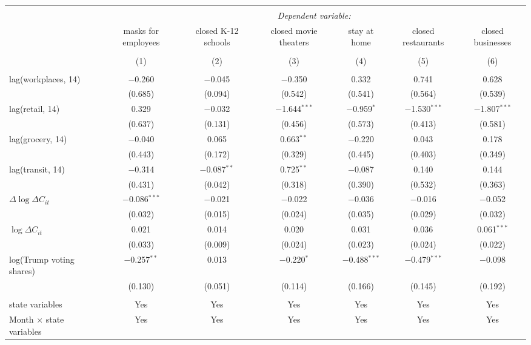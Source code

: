 \begin{tabular}{@{\extracolsep{1pt}}lcccccc} 
\\[-1.8ex]\hline 
\hline \\[-1.8ex] 
 & \multicolumn{6}{c}{\textit{Dependent variable:}} \\ 
\cline{2-7} 
 & masks for employees & closed K-12 schools & closed movie theaters & stay at home & closed restaurants & closed businesses \\ 
\\[-1.8ex] & (1) & (2) & (3) & (4) & (5) & (6)\\ 
\hline \\[-1.8ex] 
 lag(workplaces, 14) & $-$0.260 & $-$0.045 & $-$0.350 & 0.332 & 0.741 & 0.628 \\ 
  & (0.685) & (0.094) & (0.542) & (0.541) & (0.564) & (0.539) \\ 
  lag(retail, 14) & 0.329 & $-$0.032 & $-$1.644$^{***}$ & $-$0.959$^{*}$ & $-$1.530$^{***}$ & $-$1.807$^{***}$ \\ 
  & (0.637) & (0.131) & (0.456) & (0.573) & (0.413) & (0.581) \\ 
  lag(grocery, 14) & $-$0.040 & 0.065 & 0.663$^{**}$ & $-$0.220 & 0.043 & 0.178 \\ 
  & (0.443) & (0.172) & (0.329) & (0.445) & (0.403) & (0.349) \\ 
  lag(transit, 14) & $-$0.314 & $-$0.087$^{**}$ & 0.725$^{**}$ & $-$0.087 & 0.140 & 0.144 \\ 
  & (0.431) & (0.042) & (0.318) & (0.390) & (0.532) & (0.363) \\ 
  $\Delta \log \Delta C_{it}$ & $-$0.086$^{***}$ & $-$0.021 & $-$0.022 & $-$0.036 & $-$0.016 & $-$0.052 \\ 
  & (0.032) & (0.015) & (0.024) & (0.035) & (0.029) & (0.032) \\ 
  $\log \Delta C_{it}$ & 0.021 & 0.014 & 0.020 & 0.031 & 0.036 & 0.061$^{***}$ \\ 
  & (0.033) & (0.009) & (0.024) & (0.023) & (0.024) & (0.022) \\ 
  log(Trump voting shares) & $-$0.257$^{**}$ & 0.013 & $-$0.220$^{*}$ & $-$0.488$^{***}$ & $-$0.479$^{***}$ & $-$0.098 \\ 
  & (0.130) & (0.051) & (0.114) & (0.166) & (0.145) & (0.192) \\ 
 \hline \\[-1.8ex] 
state variables & Yes & Yes & Yes & Yes & Yes & Yes \\ 
Month $\times$ state variables & Yes & Yes & Yes & Yes & Yes & Yes \\ 

\end{tabular}
